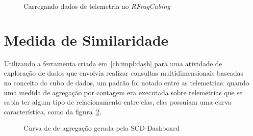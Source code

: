 \begin{figure}[ht]
  \caption{Carregando dados de telemetria no \textit{RFragCubing}}\label{fig:shinyrfrag}
	\vspace{6mm}
	\begin{center}
	\end{center}
	\vspace{4mm}
	\legenda{}
\end{figure}

\section{Medida de Similaridade}\label{ch:impl:similarity}

Utilizando a ferramenta criada em~\ref{ch:impl:dash} para uma atividade de exploração de dados que envolvia realizar consultas multidimensionais baseadas no conceito do cubo de dados, um padrão foi notado entre as telemetrias: quando uma medida de agregação por contagem era executada sobre telemetrias que se sabia ter algum tipo de relacionamento entre elas, elas possuiam uma curva característica, como da figura~\ref{fig:scdsimilaritygraph}.

\begin{figure}[ht]
	\caption{Curva de de agregação gerada pela SCD-Dashboard}\label{fig:scdsimilaritygraph}
	\vspace{6mm}
	\begin{center}
	\end{center}
	\vspace{4mm}
\end{figure}

